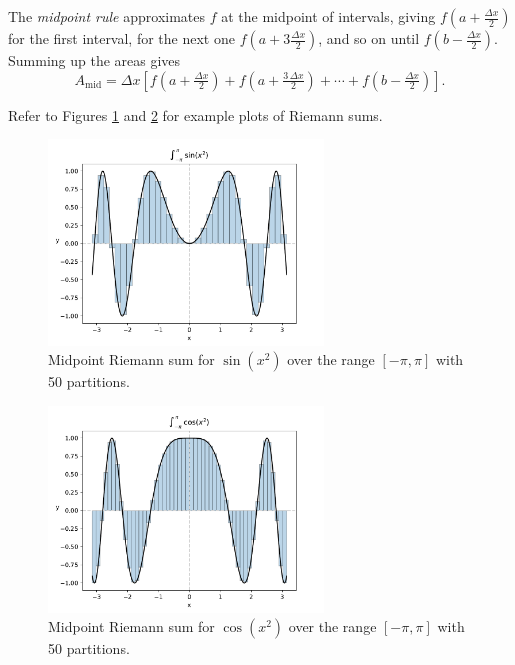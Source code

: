 The \emph{midpoint rule} approximates $f$ at the midpoint of intervals, giving
$f(a + \tfrac{\Delta x}{2})$ for the first interval, for the next one
$f(a + 3\tfrac{\Delta x}{2})$, and so on until $f(b-\tfrac{\Delta
x}{2})$. Summing up the areas gives
$$
A_\text{mid} = \Delta x\left[f \left(a +
\tfrac{\Delta x}{2} \right) + f \left(a + \tfrac{3\,\Delta x}{2}
\right) + \cdots+f \left(b-\tfrac{\Delta x}{2} \right)\right].
$$

Refer to Figures \ref{figure:riemann-sin} and \ref{figure:riemann-cos}
for example plots of Riemann sums.

\begin{figure}[bth]
  \begin{centering}
    \includegraphics[width=0.65\textwidth]{riemann/sin.pdf}
    \caption{Midpoint Riemann sum for $\sin(x^2)$ over the range $[-\pi,
    \pi]$ with 50 partitions.}\label{figure:riemann-sin}
  \end{centering}
\end{figure}

\begin{figure}[bth]
  \begin{centering}
    \includegraphics[width=0.65\textwidth]{riemann/cos.pdf}
    \caption{Midpoint Riemann sum for $\cos(x^2)$ over the range $[-\pi,
    \pi]$ with 50 partitions.}\label{figure:riemann-cos}
  \end{centering}
\end{figure}

